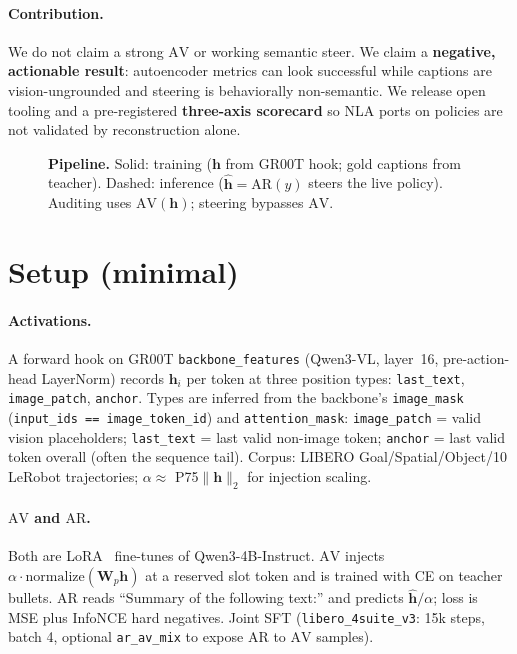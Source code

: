 \documentclass{article}
\newcommand{\AV}{\ensuremath{\mathrm{AV}}}
\newcommand{\AR}{\ensuremath{\mathrm{AR}}}
\newcommand{\hvec}{\mathbf{h}}
\newcommand{\hhat}{\hat{\mathbf{h}}}
\newcommand{\code}[1]{\texttt{\small #1}}
\begin{document}
\paragraph{Contribution.}
We do not claim a strong \AV{} or working semantic steer.
We claim a \textbf{negative, actionable result}:
autoencoder metrics can look successful while captions are
vision-ungrounded and steering is behaviorally non-semantic.
We release open tooling and a pre-registered \textbf{three-axis scorecard}
so NLA ports on policies are not validated by reconstruction alone.

\begin{figure}[t]
  \centering
  \resizebox{\linewidth}{!}{}
  \caption{\textbf{Pipeline.} Solid: training (\(\hvec\) from GR00T hook;
  gold captions from teacher).
  Dashed: inference (\(\hhat=\AR(y)\) steers the live policy).
  Auditing uses \(\AV(\hvec)\); steering bypasses \(\AV\).}
  \label{fig:pipeline}
\end{figure}

\section{Setup (minimal)}
\label{sec:setup}

\paragraph{Activations.}
A forward hook on GR00T \code{backbone\_features} (Qwen3-VL, layer~16,
pre-action-head LayerNorm) records \(\hvec_i\) per token at three position
types: \code{last\_text}, \code{image\_patch}, \code{anchor}.
Types are inferred from the backbone's \code{image\_mask}
(\code{input\_ids == image\_token\_id}) and \code{attention\_mask}:
\code{image\_patch} = valid vision placeholders;
\code{last\_text} = last valid non-image token;
\code{anchor} = last valid token overall (often the sequence tail).
Corpus: LIBERO Goal/Spatial/Object/10 LeRobot trajectories;
\(\alpha \approx \) P75\(\|\hvec\|_2\) for injection scaling.

\paragraph{\AV{} and \AR{}.}
Both are LoRA~\citep{hu2022lora} fine-tunes of Qwen3-4B-Instruct.
\AV{} injects \(\alpha\cdot\mathrm{normalize}(\mathbf{W}_p\hvec)\) at a
reserved slot token and is trained with CE on teacher bullets.
\AR{} reads ``Summary of the following text:'' and predicts
\(\hhat/\alpha\); loss is MSE plus InfoNCE hard negatives.
Joint SFT (\code{libero\_4suite\_v3}: 15k steps, batch 4, optional
\code{ar\_av\_mix} to expose \AR{} to \AV{} samples).
\end{document}
